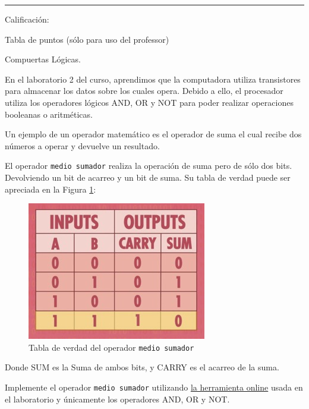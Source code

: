 \documentclass[12pt]{exam}
\begin{document}
\newpage
\noindent
\rule[2ex]{\textwidth}{2pt}
\Large{Calificación}:
\normalsize
\begin{center}
Tabla de puntos (sólo para uso del professor)\\
\addpoints
\gradetable[v][questions]
\end{center}
\noindent
\newpage

\begin{questions}

\question[5] Compuertas Lógicas.

En el laboratorio 2 del curso, aprendimos que la computadora utiliza transistores para almacenar los datos sobre los cuales opera. Debido a ello, el procesador utiliza los operadores lógicos AND, OR y NOT para poder realizar operaciones booleanas o aritméticas.

Un ejemplo de un operador matemático es el operador de suma el cual recibe dos números a operar y devuelve un resultado.

El operador \lstinline{medio sumador} realiza la operación de suma pero de sólo dos bits. Devolviendo un bit de acarreo y un bit de suma. Su tabla de verdad puede ser apreciada en la Figura \ref{fig:suma}:

\begin{figure}[ht!]
  \centering
  \includegraphics[width=0.4\linewidth]{../figures/suma.jpg}
  \caption{Tabla de verdad del operador \lstinline{medio sumador}}
  \label{fig:suma}
\end{figure}

Donde SUM es la Suma de ambos bits, y CARRY es el acarreo de la suma.

Implemente el operador \lstinline{medio sumador} utilizando \href{https://academo.org/demos/logic-gate-simulator/}{la herramienta online} usada en el laboratorio y únicamente los operadores AND, OR y NOT.


\end{questions}
\end{document}
